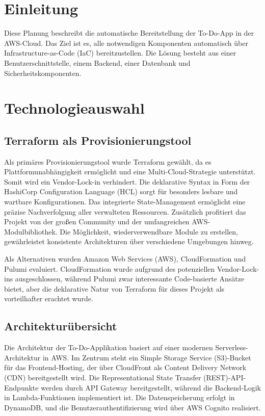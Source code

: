 \newpage

\section{Einleitung}
Diese Planung beschreibt die automatische
Bereitstellung der To-Do-App in der AWS-Cloud. Das Ziel ist es,
alle notwendigen Komponenten automatisch über Infrastructure-as-Code (IaC)
bereitzustellen. Die Lösung besteht aus einer Benutzerschnittstelle, einem Backend,
einer Datenbank und Sicherheitskomponenten.

\section{Technologieauswahl} 
\subsection{Terraform als Provisionierungstool}
Als primäres Provisionierungstool wurde Terraform gewählt, da es
Plattformunabhängigkeit ermöglicht und eine Multi-Cloud-Strategie unterstützt. Somit
wird ein Vendor-Lock-in verhindert. Die deklarative Syntax in Form der HashiCorp
Configuration Language (HCL) sorgt für besonders lesbare und wartbare
Konfigurationen. Das integrierte State-Management ermöglicht eine präzise
Nachverfolgung aller verwalteten Ressourcen. Zusätzlich profitiert das Projekt
von der großen Community und der umfangreichen AWS-Modulbibliothek. 
Die Möglichkeit, wiederverwendbare Module zu erstellen, gewährleistet 
konsistente Architekturen über verschiedene Umgebungen hinweg.

Als Alternativen wurden Amazon Web Services (AWS), CloudFormation und Pulumi evaluiert. 
CloudFormation wurde aufgrund des potenziellen Vendor-Lock-ins ausgeschlossen, während
Pulumi zwar interessante Code-basierte Ansätze bietet, aber die deklarative
Natur von Terraform für dieses Projekt als vorteilhafter erachtet wurde.

\subsection{Architekturübersicht}
Die Architektur der To-Do-Applikation basiert auf einer modernen 
Serverless-Architektur in AWS. Im Zentrum steht ein Simple Storage Service (S3)-Bucket 
für das Frontend-Hosting, der über CloudFront als Content Delivery Network (CDN)
bereitgestellt wird. Die Representational State Transfer (REST)-API-Endpunkte
werden durch API Gateway bereitgestellt, während die Backend-Logik in
Lambda-Funktionen implementiert ist. Die Datenspeicherung erfolgt in DynamoDB,
und die Benutzerauthentifizierung wird über AWS Cognito realisiert.


